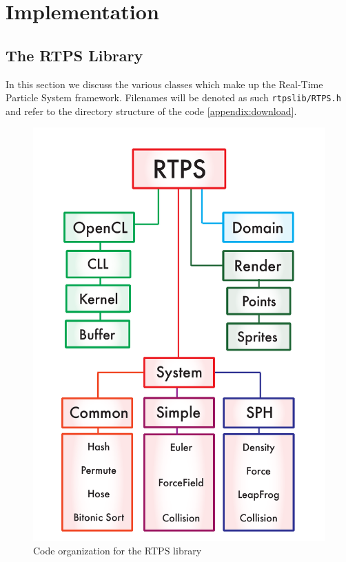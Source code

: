 \chapter{Implementation}

\section{The RTPS Library}

In this section we discuss the various classes which make up the Real-Time
Particle System framework. Filenames will be denoted as such \verb|rtpslib/RTPS.h|
and refer to the directory structure of the code \ref{appendix:download}.

\begin{figure}[!htc]
 		\centering
		\includegraphics[scale=0.4]{figures/rtps_flow.pdf}
        \caption{ Code organization for the RTPS library}
		\label{fig:flowchart}
\end{figure}






